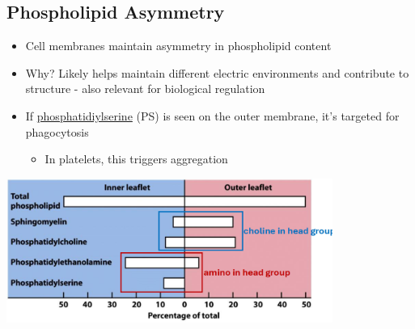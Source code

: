 \documentclass[10pt]{article}
\begin{document}
\subsection*{Phospholipid Asymmetry}
\begin{itemize}
    \item Cell membranes maintain asymmetry in phospholipid content
    \item Why?  Likely helps maintain different electric environments and contribute to structure - also relevant for biological regulation
    \item If \underline{phosphatidiylserine} (PS) is seen on the outer membrane, it's targeted for phagocytosis
    \begin{itemize}
        \item In platelets, this triggers aggregation
    \end{itemize}
\end{itemize}
\begin{center}
    \includegraphics*[width=0.8\textwidth]{L3_10.png}
\end{center}
\end{document}
